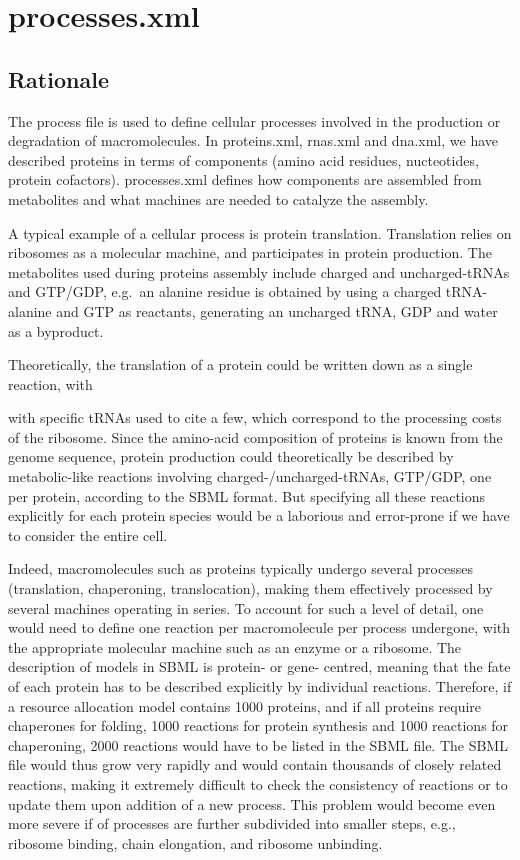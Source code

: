 
\section{processes.xml}

\subsection{Rationale}

The process file is used to define cellular processes involved in
the production or degradation of macromolecules.
In proteins.xml, rnas.xml and dna.xml, we have described proteins in terms of
components (amino acid residues, nucteotides, protein cofactors).
processes.xml defines how components are assembled from metabolites and
what machines are needed to catalyze the assembly.

A typical example of a cellular process is protein translation.
Translation relies on ribosomes as a molecular machine,
and participates in protein production.
The metabolites used during proteins assembly include
charged and uncharged-tRNAs and GTP/GDP,
e.g.\ an alanine residue is obtained by using a charged tRNA-alanine and GTP as
reactants, generating an uncharged tRNA, GDP and water as a byproduct.

Theoretically, the translation of a protein could be written down as a single reaction,
with

with specific tRNAs used
to cite a few, which correspond to the processing costs of the ribosome.
Since the amino-acid composition of proteins is known from the genome sequence,
protein production could theoretically be described by metabolic-like reactions
involving charged-/uncharged-tRNAs, GTP/GDP, one per protein, according to the SBML format.
But specifying all these reactions explicitly for each protein species
would be a laborious and error-prone if we have to consider the entire cell.

Indeed, macromolecules such as proteins typically undergo several processes
(translation, chaperoning, translocation),
making them effectively processed by several machines operating in series.
To account for such a level of detail,
one would need to define one reaction per macromolecule per process undergone,
with the appropriate molecular machine such as an enzyme or a ribosome.
The description of models in SBML is protein- or gene- centred,
meaning that the fate of each protein has to be described explicitly by individual reactions.
Therefore, if a resource allocation model contains 1000 proteins,
and if all proteins require chaperones for folding,
1000 reactions for protein synthesis and 1000 reactions for chaperoning,
2000 reactions would have to be listed in the SBML file.
The SBML file would thus grow very rapidly and would contain thousands of closely related reactions,
making it extremely difficult to check the consistency of reactions
or to update them upon addition of a new process.
This problem would become even more severe if of processes are further subdivided
into smaller steps, e.g., ribosome binding, chain elongation, and ribosome unbinding.

